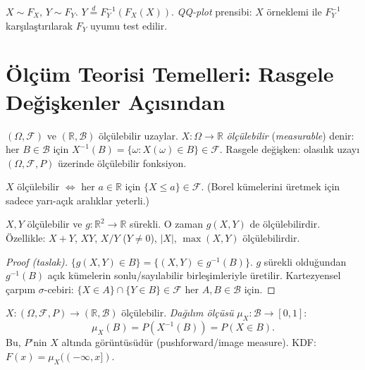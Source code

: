 \begin{teorem}
\label{thm:qq_iliskisi}
$X \sim F_X$, $Y \sim F_Y$. $Y \overset{d}{=} F_Y^{-1}(F_X(X))$.
\emph{QQ-plot} prensibi: $X$ örneklemi ile $F_Y^{-1}$ karşılaştırılarak $F_Y$ uyumu test edilir.
\end{teorem}

\section{Ölçüm Teorisi Temelleri: Rasgele Değişkenler Açısından}
\label{sec:olcum_temelleri}

\begin{tanim}\label{def:olculebilir}
$(\Omega,\mathcal{F})$ ve $(\mathbb{R},\mathcal{B})$ ölçülebilir uzaylar. $X:\Omega\to\mathbb{R}$ \emph{ölçülebilir} (\emph{measurable}) denir: her $B\in\mathcal{B}$ için $X^{-1}(B)=\{\omega:X(\omega)\in B\}\in\mathcal{F}$.
Rasgele değişken: olasılık uzayı $(\Omega,\mathcal{F},P)$ üzerinde ölçülebilir fonksiyon.
\end{tanim}

\begin{teorem}\label{thm:olculebilirlik}
$X$ ölçülebilir $\iff$ her $a\in\mathbb{R}$ için $\{X\leq a\}\in\mathcal{F}$. (Borel kümelerini üretmek için sadece yarı-açık aralıklar yeterli.)
\end{teorem}

\begin{teorem}\label{thm:olculebilir_kapali}
$X,Y$ ölçülebilir ve $g:\mathbb{R}^2\to\mathbb{R}$ sürekli. O zaman $g(X,Y)$ de ölçülebilirdir. Özellikle: $X+Y$, $XY$, $X/Y$ ($Y\neq0$), $|X|$, $\max(X,Y)$ ölçülebilirdir.
\end{teorem}

\begin{proof}[Proof (taslak)]
$\{g(X,Y)\in B\}=\{(X,Y)\in g^{-1}(B)\}$. $g$ sürekli olduğundan $g^{-1}(B)$ açık kümelerin sonlu/sayılabilir birleşimleriyle üretilir. Kartezyensel çarpım $\sigma$-cebiri: $\{X\in A\}\cap\{Y\in B\}\in\mathcal{F}$ her $A,B\in\mathcal{B}$ için.
\end{proof}

\begin{tanim}\label{def:dagilim_olcum}
$X:(\Omega,\mathcal{F},P)\to(\mathbb{R},\mathcal{B})$ ölçülebilir. \emph{Dağılım ölçüsü} $\mu_X:\mathcal{B}\to[0,1]$:
\[
  \mu_X(B) = P(X^{-1}(B)) = P(X\in B).
\]
Bu, $P$'nin $X$ altında görüntüsüdür (pushforward/image measure). KDF: $F(x)=\mu_X((-\infty,x])$.
\end{tanim}

